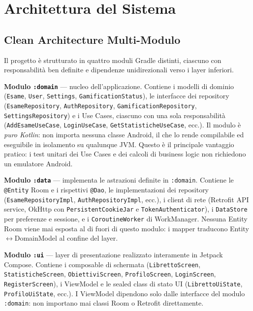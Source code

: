 \documentclass[a4paper,12pt]{report}
\begin{document}
    \section{Architettura del Sistema}

    \subsection{Clean Architecture Multi-Modulo}

    Il progetto è strutturato in quattro moduli Gradle distinti, ciascuno con
    responsabilità ben definite e dipendenze unidirezionali verso i layer inferiori.

    \textbf{Modulo \texttt{:domain}} --- nucleo dell'applicazione. Contiene i modelli
    di dominio (\texttt{Esame}, \texttt{User}, \texttt{Settings}, \texttt{GamificationStatus}),
    le interfacce dei repository (\texttt{EsameRepository}, \texttt{AuthRepository},
    \texttt{GamificationRepository}, \texttt{SettingsRepository}) e i Use Cases, ciascuno
    con una sola responsabilità (\texttt{AddEsameUseCase}, \texttt{LoginUseCase},
    \texttt{GetStatisticheUseCase}, ecc.). Il modulo è \emph{puro Kotlin}: non importa
    nessuna classe Android, il che lo rende compilabile ed eseguibile in isolamento
    su qualunque JVM. Questo è il principale vantaggio pratico: i test unitari dei
    Use Cases e dei calcoli di business logic non richiedono un emulatore Android.

    \textbf{Modulo \texttt{:data}} --- implementa le astrazioni definite in \texttt{:domain}.
    Contiene le \texttt{@Entity} Room e i rispettivi \texttt{@Dao}, le implementazioni
    dei repository (\texttt{EsameRepositoryImpl}, \texttt{AuthRepositoryImpl}, ecc.),
    i client di rete (Retrofit API service, OkHttp con \texttt{PersistentCookieJar} e
    \texttt{TokenAuthenticator}), i \texttt{DataStore} per preferenze e sessione, e i
    \texttt{CoroutineWorker} di WorkManager. Nessuna Entity Room viene mai esposta al
    di fuori di questo modulo: i mapper traducono Entity$\leftrightarrow$DomainModel al confine del layer.

    \textbf{Modulo \texttt{:ui}} --- layer di presentazione realizzato interamente in
    Jetpack Compose. Contiene i composable di schermata (\texttt{LibrettoScreen},
    \texttt{StatisticheScreen}, \texttt{ObiettiviScreen}, \texttt{ProfiloScreen},
    \texttt{LoginScreen}, \texttt{RegisterScreen}), i ViewModel e le sealed class
    di stato UI (\texttt{LibrettoUiState}, \texttt{ProfiloUiState}, ecc.).
    I ViewModel dipendono solo dalle interfacce del modulo \texttt{:domain}: non
    importano mai classi Room o Retrofit direttamente.
\end{document}
